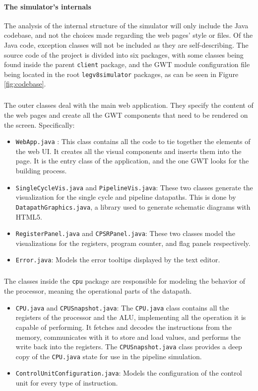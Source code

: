 \paragraph{The simulator's internals}
The analysis of the internal structure of the simulator will only include the Java codebase, and not the choices made regarding the web pages' style or files. Of the Java code, exception classes will not be included as they are self-describing.
The source code of the project is divided into six packages, with some classes being found inside the parent \verb|client| package, and the GWT module configuration file being located in the root \verb|legv8simulator| packages, as can be seen in Figure \ref{fig:codebase}.
\subparagraph{}
The outer classes deal with the main web application. They specify the content of the web pages and create all the GWT components that need to be rendered on the screen. Specifically:
\begin{itemize}
	\item \verb|WebApp.java| : This class contains all the code to tie together the elements of the web UI. It creates all the visual components and inserts them into the page. It is the entry class of the application, and the one GWT looks for the building process.
	\item \verb|SingleCycleVis.java| and \verb|PipelineVis.java|:  These two classes generate the visualization for the single cycle and pipeline datapaths. This is done by \verb|DatapathGraphics.java|, a library used to generate schematic diagrams with HTML5.
	\item \verb|RegisterPanel.java| and \verb|CPSRPanel.java|:  These two classes model the visualizations for the registers, program counter, and flag panels respectively.
	\item \verb|Error.java|:  Models the error tooltips displayed by the text editor.
\end{itemize}
\subparagraph{}
The classes inside the \verb|cpu| package are responsible for modeling the behavior of the processor, meaning the operational parts of the datapath.
\begin{itemize}
\item \verb|CPU.java| and \verb|CPUSnapshot.java|:  The \verb|CPU.java| class contains all the registers of the processor and the ALU, implementing all the operation it is capable of performing. It fetches and decodes the instructions from the memory, communicates with it to store and load values, and performs the write back into the registers. The \verb|CPUSnapshot.java| class provides a deep copy of the \verb|CPU.java| state for use in the pipeline simulation.
\item \verb|ControlUnitConfiguration.java|:  Models the configuration of the control unit for every type of instruction.
\end{itemize}
